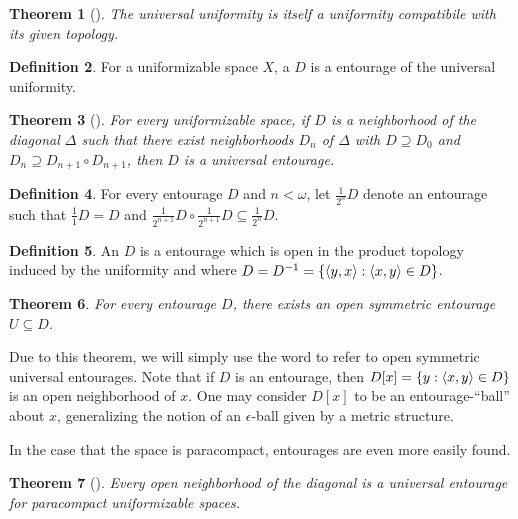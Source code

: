 \documentclass{amsart}
\newtheorem{theorem}{Theorem}[section]
\theoremstyle{definition}
\newtheorem{definition}[theorem]{Definition}
\begin{document}
  \begin{theorem}[\cite{MR2048350}]
    The universal uniformity is itself a uniformity compatibile with
    its given topology.
  \end{theorem}

  \begin{definition}
    For a uniformizable space \(X\), a  \(D\) is a
    entourage of the universal uniformity.
  \end{definition}

  \begin{theorem}[\cite{MR2048350}]
    For every uniformizable space, if \(D\) is a neighborhood of the diagonal
    \(\Delta\)  such that there exist neighborhoods \(D_n\) of \(\Delta\) with
    \(D\supseteq D_0\) and
    \(D_n \supseteq D_{n+1}\circ D_{n+1}\), then \(D\) is a
    universal entourage.
  \end{theorem}

  \begin{definition}
    For every entourage \(D\) and \(n<\omega\), let \(\frac{1}{2^n}D\)
    denote an entourage such that \(\frac{1}{1}D=D\) and
    \(\frac{1}{2^{n+1}}D\circ\frac{1}{2^{n+1}}D\subseteq\frac{1}{2^n}D\).
  \end{definition}

  \begin{definition}
    An  \(D\) is a entourage
    which is open in the product topology induced by the uniformity and where
    \(D=D^{-1}=\{\langle y,x\rangle:\langle x,y\rangle\in D\}\).
  \end{definition}

  \begin{theorem}
    For every entourage \(D\), there exists an open symmetric
    entourage \(U\subseteq D\).
  \end{theorem}

  Due to this theorem, we will simply use the word  to refer
  to open symmetric universal entourages. Note that if \(D\) is an
  entourage, then \(D[x]=\{y:\langle x,y\rangle\in D\}\) is an open neighborhood of \(x\).
  One may consider
  \(D[x]\) to be an entourage-``ball'' about \(x\), generalizing the notion of
  an \(\epsilon\)-ball given by a metric structure.

  In the case that
  the space is paracompact, entourages are even more easily found.

  \begin{theorem}[\cite{MR2048350}]
    Every open neighborhood of the diagonal is a universal entourage for
    paracompact uniformizable spaces.
  \end{theorem}
\end{document}
